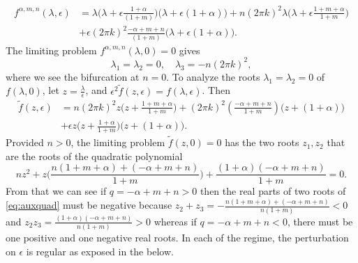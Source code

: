 \documentclass[a4paper,11pt]{article}
\theoremstyle{remark}
\begin{document}
\begin{align}
f^{\alpha,m,n}(\lambda,\epsilon)&= \lambda\Big(\lambda + \epsilon\frac{1+\alpha}{(1+m)}\Big)\Big(\lambda + \epsilon(1+\alpha)\Big) + n(2\pi k)^2\lambda\Big(\lambda + \epsilon\frac{1+m+\alpha}{1+m}\Big) \nonumber \\
&+ \epsilon(2\pi k)^2\frac{-\alpha+m+n}{(1+m)}\Big(\lambda + \epsilon(1+\alpha)\Big).
\end{align}
The limiting problem $f^{\alpha,m,n}(\lambda,0)=0$ gives
$$ \lambda_1=\lambda_2=0, \quad \lambda_3 = -n(2\pi k)^2,$$
where we see the bifurcation at $n=0$. To analyze the roots $\lambda_1=\lambda_2=0$  of $f(\lambda,0)$, let $z = \frac{\lambda}{\epsilon}$, and $\epsilon^2\tilde{f}(z,\epsilon) =  f(\lambda, \epsilon)$. Then
\begin{align}
 \tilde{f}(z,\epsilon) &= n(2\pi k)^2 z\Big(z + \frac{1+m+\alpha}{1+m}\Big)+ (2\pi k)^2\left(\frac{-\alpha+m+n}{1+m}\right)\Big(z + (1+\alpha)\Big) \nonumber\\
 &+ \epsilon z\Big(z+\frac{1+\alpha}{1+m}\Big)\Big(z+(1+\alpha)\Big). \label{eq:reduced_poly}
\end{align}
Provided $n>0$, the limiting problem $\tilde{f}(z,0)=0$ has the two roots $z_1,z_2$ that are the roots of the quadratic polynomial
\begin{equation}
nz^2 + z\Big( \frac{n(1+m+\alpha) + (-\alpha+m+n)}{1+m}\Big) + \frac{(1+\alpha)(-\alpha+m+n)}{1+m} =0. \label{eq:auxquad}
\end{equation}
From that we can see if $q=-\alpha+m+n>0$ then the real parts of two roots of \eqref{eq:auxquad} must be negative because $z_2+z_3 = -\frac{n(1+m+\alpha) + (-\alpha+m+n)}{n(1+m)} < 0$ and $z_2z_3=\frac{(1+\alpha)(-\alpha+m+n)}{n(1+m)}>0$ whereas if $q=-\alpha+m+n<0$, there must be one positive and one negative real roots.
In each of the regime, the perturbation on $\epsilon$ is regular as exposed in the below.
\end{document}
